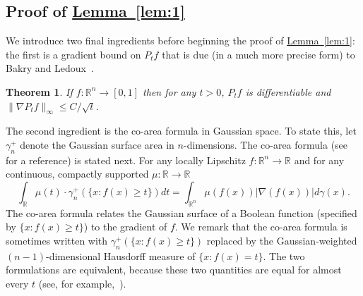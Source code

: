 \documentclass[11pt]{article}
\numberwithin{equation}{section}
\newtheorem{theorem}{Theorem}[section]
\theoremstyle{definition}
\theoremstyle{plain}
\newcommand{\R}{\mathbb R}
\newcommand{\expref}[2]{\hyperref[#2]{#1~\ref{#2}}}
\begin{document}
%

\subsection{Proof of \expref{Lemma}{lem:1}}

We introduce two final ingredients before beginning the proof of \expref{Lemma}{lem:1}: the first is a gradient bound on $P_t f$
that is due (in a much more precise form) to Bakry and Ledoux~\cite{BakryLedoux:96}.
\begin{theorem}\label{thm:bakry-ledoux}
  If $f: \R^n \to [0, 1]$ then for any $t > 0$, $P_t f$ is differentiable and $\|\nabla P_t f\|_\infty \le C/\sqrt{t}$.
\end{theorem}

The second ingredient is the co-area formula in Gaussian space. To state this, let $\gamma_n^{+}$ denote the Gaussian surface area in $n$-dimensions. The co-area formula (see~\cite{federer1969} for a reference) is stated next. For any locally Lipschitz $f: \mathbb{R}^n \rightarrow \mathbb{R}$ and for any continuous, compactly supported $\mu : \mathbb{R} \rightarrow \mathbb{R}$ 
\[
\int_{\mathbb{R}} \mu(t) \cdot \gamma_n^{+} (\{x: f(x) \ge t\}) dt = \int_{\mathbb{R}^n} \mu(f(x)) |\nabla(f(x))| d \gamma(x).
\]
The co-area formula relates the Gaussian surface of a Boolean function (specified by $\{x: f(x) \ge t\}$) to the gradient of $f$. We remark that the co-area formula is sometimes written with $\gamma_n^+(\{x: f(x) \ge t\})$ replaced by the Gaussian-weighted $(n-1)$-dimensional Hausdorff measure of $\{x: f(x) = t\}$. The two formulations are equivalent, because these two quantities are equal for almost every $t$ (see, for example,~\cite[Chapter 13]{Maggi:12}).
\end{document}
